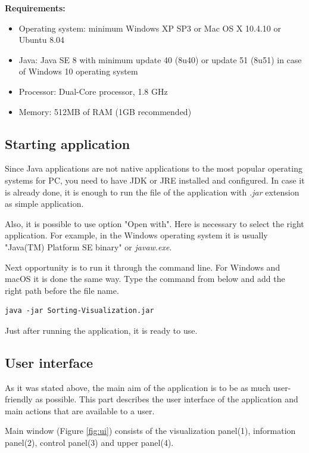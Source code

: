 \documentclass[
  field=inf,
  biblatex,
  language=english,
  glossaries,
  theorems=false,
  index
]{kidiplom}
\begin{document}
\noindent \textbf{Requirements:}
\begin{itemize}
	\item Operating system: minimum Windows XP SP3 or Mac OS X 10.4.10 or Ubuntu 8.04 
	\item Java: Java SE 8 with minimum update 40 (8u40) or update 51 (8u51) in case of Windows 10 operating system
	\item Processor: Dual-Core processor, 1.8 GHz
	\item Memory: 512MB of RAM (1GB recommended)
\end{itemize}

\subsection{Starting application}

Since Java applications are not native applications to the most popular operating systems for PC, you need to have JDK or JRE installed and configured. In case it is already done, it is enough to run the file of the application with \textit{.jar} extension as simple application.

Also, it is possible to use option "Open with". Here is necessary to select the right application. For example, in the Windows operating system it is usually "Java(TM) Platform SE binary" or \textit{javaw.exe}.

Next opportunity is to run it through the command line. For Windows and macOS it is done the same way. Type the command from below and add the right path before the file name. 
\begin{lstlisting}
java -jar Sorting-Visualization.jar
\end{lstlisting}

Just after running the application, it is ready to use.

\subsection{User interface}

As it was stated above, the main aim of the application is to be as much user-friendly as possible. This part describes the user interface of the application and main actions that are available to a user.

Main window (Figure \ref{fig:ui}) consists of the visualization panel(1), information panel(2), control panel(3) and upper panel(4).
\end{document}
